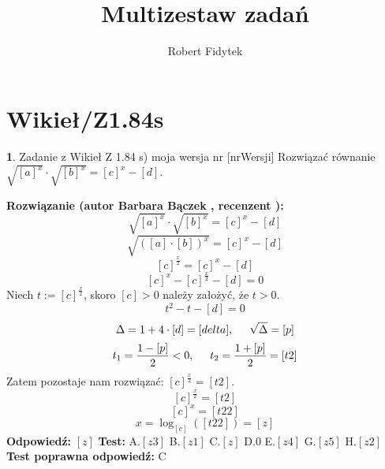 \documentclass[12pt, a4paper]{article}
\title{Multizestaw zadań}
\author{Robert Fidytek}
\date{}
\theoremstyle{definition} %
\newtheorem{zad}{}
\newcommand{\kategoria}[1]{\section{#1}} %
\newcommand{\zadStart}[1]{\begin{zad}#1\newline} %
\newcommand{\zadStop}{\end{zad}}   %
\newcommand{\rozwStart}[2]{\noindent \textbf{Rozwiązanie (autor #1 , recenzent #2): }\newline} %
\newcommand{\rozwStop}{\newline}                                            %
\newcommand{\odpStart}{\noindent \textbf{Odpowiedź:}\newline}    %
\newcommand{\odpStop}{\newline}                                             %
\newcommand{\testStart}{\noindent \textbf{Test:}\newline} %
\newcommand{\testStop}{\newline} %
\newcommand{\kluczStart}{\noindent \textbf{Test poprawna odpowiedź:}\newline} %
\newcommand{\kluczStop}{\newline} %
\begin{document}
\maketitle


\kategoria{Wikieł/Z1.84s}
\zadStart{Zadanie z Wikieł Z 1.84 s) moja wersja nr [nrWersji]}
Rozwiązać równanie $\sqrt{{[a]}^x} \cdot \sqrt{{[b]}^x}= {[c]}^x -[d]$.
\zadStop
\rozwStart{Barbara Bączek}{}
$$\sqrt{{[a]}^x} \cdot \sqrt{{[b]}^x}= {[c]}^x -[d]$$
$$\sqrt{{([a]\cdot [b])}^x} = {[c]}^x -[d]$$
$${[c]}^{\frac{x}{2}}={[c]}^x-[d]$$
$${[c]}^x-{[c]}^{\frac{x}{2}}-[d]=0$$
Niech $t:={[c]}^{\frac{x}{2}}$, skoro $[c]>0$ należy założyć, że $t>0$.
$$t^2-t-[d]=0$$
$$\Delta= 1+ 4\cdot[d]= [delta], \hspace{0.5 cm} \sqrt{\Delta}= [p]$$
$$t_1=\frac{1- [p]}{2} <0, \hspace{0.5 cm} t_2=\frac{1+[p]}{2}=[t2]$$
Zatem pozostaje nam rozwiązać: ${[c]}^{\frac{x}{2}}=[t2]$.
$${[c]}^{\frac{x}{2}}=[t2]$$
$${[c]}^x=[t22]$$
$$x=\log_{[c]}([t22])=[z]$$
\rozwStop
\odpStart
$[z]$
\odpStop
\testStart
A.$[z3]$
B.$[z1]$
C.$[z]$
D.$0$
E.$[z4]$
G.$[z5]$
H.$[z2]$
\testStop
\kluczStart
C
\kluczStop
\end{document}
